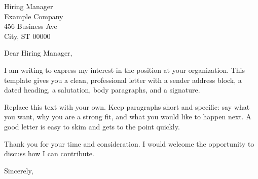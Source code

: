 \documentclass[11pt]{letter}
\begin{document}
\begin{letter}{Hiring Manager \\ Example Company \\ 456 Business Ave \\ City, ST 00000}

\opening{Dear Hiring Manager,}

I am writing to express my interest in the position at your organization. This
template gives you a clean, professional letter with a sender address block, a
dated heading, a salutation, body paragraphs, and a signature.

Replace this text with your own. Keep paragraphs short and specific: say what you
want, why you are a strong fit, and what you would like to happen next. A good
letter is easy to skim and gets to the point quickly.

Thank you for your time and consideration. I would welcome the opportunity to
discuss how I can contribute.

\closing{Sincerely,}

\end{letter}
\end{document}
